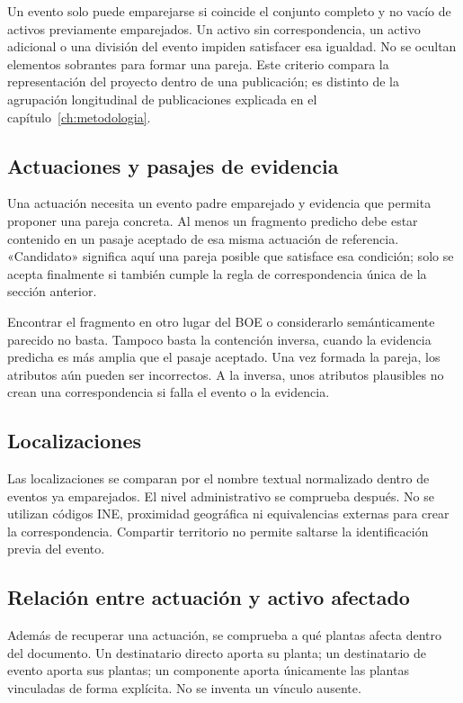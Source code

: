 Un evento solo puede emparejarse si coincide el conjunto completo y no vacío
de activos previamente emparejados. Un activo sin correspondencia, un
activo adicional o una división del evento impiden satisfacer esa igualdad.
No se ocultan elementos sobrantes para formar una pareja. Este criterio
compara la representación del proyecto dentro de una publicación; es
distinto de la agrupación longitudinal de publicaciones explicada en el
capítulo~\ref{ch:metodologia}.

\subsection{Actuaciones y pasajes de evidencia}
Una actuación necesita un evento padre emparejado y evidencia que permita
proponer una pareja concreta. Al menos un fragmento predicho debe estar
contenido en un pasaje aceptado de esa misma actuación de referencia.
«Candidato» significa aquí una pareja posible que satisface esa condición;
solo se acepta finalmente si también cumple la regla de correspondencia
única de la sección anterior.

Encontrar el fragmento en otro lugar del BOE o considerarlo semánticamente
parecido no basta. Tampoco basta la contención inversa, cuando la evidencia
predicha es más amplia que el pasaje aceptado. Una vez formada la pareja,
los atributos aún pueden ser incorrectos. A la inversa, unos atributos
plausibles no crean una correspondencia si falla el evento o la evidencia.

\subsection{Localizaciones}
Las localizaciones se comparan por el nombre textual normalizado dentro de
eventos ya emparejados. El nivel administrativo se comprueba después.
No se utilizan códigos INE, proximidad geográfica ni equivalencias externas
para crear la correspondencia. Compartir territorio no permite saltarse
la identificación previa del evento.

\subsection{Relación entre actuación y activo afectado}
Además de recuperar una actuación, se comprueba a qué plantas afecta dentro
del documento. Un destinatario directo aporta su planta; un destinatario de
evento aporta sus plantas; un componente aporta únicamente las plantas
vinculadas de forma explícita. No se inventa un vínculo ausente.

